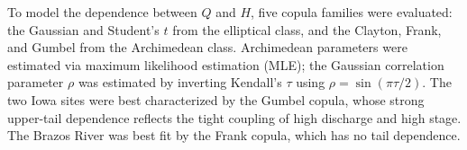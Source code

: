 \documentclass[11pt]{article}
\begin{document}
To model the dependence between $Q$ and $H$, five copula families were evaluated: the Gaussian and Student's $t$ from the elliptical class, and the Clayton, Frank, and Gumbel from the Archimedean class. Archimedean parameters were estimated via maximum likelihood estimation (MLE); the Gaussian correlation parameter $\rho$ was estimated by inverting Kendall's $\tau$ using $\rho = \sin(\pi\tau/2)$. The two Iowa sites were best characterized by the Gumbel copula, whose strong upper-tail dependence reflects the tight coupling of high discharge and high stage. The Brazos River was best fit by the Frank copula, which has no tail dependence. 
\end{document}
